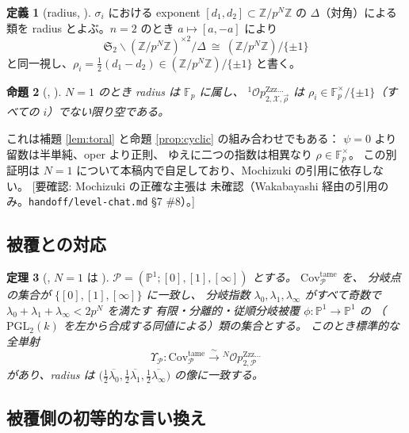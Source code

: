 \documentclass[a4paper,11pt]{ltjsarticle}
\theoremstyle{plain}
\newtheorem{theorem}{定理}[section]
\newtheorem{proposition}[theorem]{命題}
\theoremstyle{definition}
\newtheorem{definition}[theorem]{定義}
\newcommand{\NeedsCheck}[1]{\textcolor{blue!70!black}{\textsf{[要確認: #1]}}}
\newcommand{\bbP}{\mathbb{P}}
\newcommand{\bbZ}{\mathbb{Z}}
\newcommand{\bbF}{\mathbb{F}}
\newcommand{\sX}{\mathscr{X}}
\newcommand{\sP}{\mathscr{P}}
\newcommand{\fS}{\mathfrak{S}}
\newcommand{\Op}{\mathcal{O}p}
\newcommand{\Zzz}{\mathrm{Zzz\dots}}
\begin{document}
\begin{definition}[radius, {\cite[Def.~4.3.2, Rem.~4.3.1]{Wak}}]
$\sigma_i$ における exponent $[d_1,d_2]\subset\bbZ/p^N\bbZ$ の
$\Delta$（対角）による類を radius とよぶ。$n=2$ のとき
$a\mapsto[a,-a]$ により
\[
  \fS_2\backslash(\bbZ/p^N\bbZ)^{\times2}/\Delta\ \cong\ (\bbZ/p^N\bbZ)/\{\pm1\}
\]
と同一視し、$\rho_i=\tfrac12(d_1-d_2)\in(\bbZ/p^N\bbZ)/\{\pm1\}$ と書く。
\end{definition}

\begin{proposition}[{\cite[Rem.~4.3.3]{Wak}}, {\cite[Chap.~II, Prop.~1.4, 1.5]{Moc}}]
\label{prop:radius-unit}
$N=1$ のとき radius は $\bbF_p$ に属し、
${}^1\Op^{\Zzz}_{2,\sX,\vec\rho}$ は
$\rho_i\in\bbF_p^\times/\{\pm1\}$（すべての $i$）でない限り空である。
\end{proposition}

これは補題 \ref{lem:toral} と命題 \ref{prop:cyclic} の組み合わせでもある：
$\psi=0$ より留数は半単純、oper より正則、
ゆえに二つの指数は相異なり $\rho\in\bbF_p^\times$。
この別証明は $N=1$ について本稿内で自足しており、Mochizuki の引用に依存しない。
\NeedsCheck{Mochizuki \cite[Chap.~II, Prop.~1.4, 1.5]{Moc} の正確な主張は
未確認（Wakabayashi 経由の引用のみ。\texttt{handoff/level-chat.md} \S7 \#8）。}

\subsection{被覆との対応}

\begin{theorem}[{\cite[Thm.~C]{Wak}}, $N=1$ は {\cite[Introduction, Thm.~1.3]{Moc}}]
\label{thm:covering}
$\sP=(\bbP^1;[0],[1],[\infty])$ とする。
$\mathrm{Cov}^{\mathrm{tame}}_{\sP}$ を、
分岐点の集合が $\{[0],[1],[\infty]\}$ に一致し、
分岐指数 $\lambda_0,\lambda_1,\lambda_\infty$ がすべて奇数で
$\lambda_0+\lambda_1+\lambda_\infty<2p^N$ を満たす
有限・分離的・従順分岐被覆 $\phi:\bbP^1\to\bbP^1$ の
（$\mathrm{PGL}_2(k)$ を左から合成する同値による）類の集合とする。
このとき標準的な全単射
\[
  \Upsilon_{\sP}:\mathrm{Cov}^{\mathrm{tame}}_{\sP}
  \xrightarrow{\ \sim\ }{}^N\Op^{\Zzz}_{2,\sP}
\]
があり、radius は $\bigl(\tfrac12\overline{\lambda_0},
\tfrac12\overline{\lambda_1},\tfrac12\overline{\lambda_\infty}\bigr)$ の像に一致する。
\end{theorem}

\subsection{被覆側の初等的な言い換え}
\end{document}
